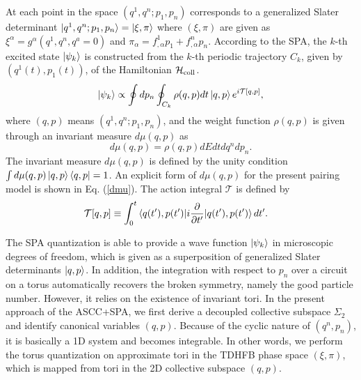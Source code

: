 \documentclass[11pt]{book} %
\begin{document}
At each point in the space $(q^1,q^n; p_1,p_n)$ corresponds to
a generalized Slater determinant
$\ket{q^1,q^n;p_1,p_n}=\ket{\xi,\pi}$
where $(\xi,\pi)$ are given as
$\xi^\alpha=g^\alpha(q^1,q^n,q^a=0)$ and
$\pi_\alpha=f^1_{,\alpha}p_1+f^n_{,\alpha}p_n$.
According to the SPA, the $k$-th excited state $\ket{\psi_k}$
is constructed from the $k$-th periodic trajectory $C_k$,
given by $(q^1(t),p_1(t))$,
of the Hamiltonian $\mathcal{H}_{\rm coll}$.
\begin{equation}
\ket{\psi_k} \propto \oint dp_n \oint_{C_k} \rho(q,p) dt \ket{q,p}
	e^{i\mathcal{T}[q,p]} ,
	\label{SPA}
\end{equation}
where $(q,p)$ means $(q^1,q^n;p_1, p_n)$, and the weight function
$\rho(q,p)$ is given through an invariant measure $d\mu(q,p)$ as
\begin{equation}
d\mu(q,p)=\rho(q,p) dE dt dq^n dp_n .
\end{equation}
The invariant measure $d\mu(q,p)$ is defined by the unity condition
$\int d\mu(q,p) \ket{q,p}\bra{q,p} = 1$.
An explicit form of $d\mu(q,p)$ for the present pairing model is shown
in Eq. (\ref{dmu}).
The action integral $\mathcal{T}$ is defined by
\begin{align}
\mathcal{T}[q,p] &\equiv
\int_{0}^{t} \braket{q(t'),p(t')| i\frac{\partial}{\partial t'}
	|q(t'),p(t')} dt' .
\label{tau}
\end{align}

The SPA quantization is able to provide a wave function $\ket{\psi_k}$
in microscopic degrees of freedom, which is given as a superposition
of generalized Slater determinants $\ket{q,p}$.
In addition, the integration with respect to $p_n$ over a circuit on a torus
automatically recovers the broken symmetry, namely the good particle number.
However, it relies on the existence of invariant tori.
In the present approach of the ASCC+SPA,
we first derive a decoupled collective subspace $\Sigma_2$ and identify
canonical variables $(q,p)$.
Because of the cyclic nature of $(q^n,p_n)$, it is basically a 1D system
and becomes integrable.
In other words, we perform the torus quantization on
approximate tori in the TDHFB phase space $(\xi,\pi)$,
which is mapped from tori in the 2D collective subspace $(q,p)$.



\end{document}
